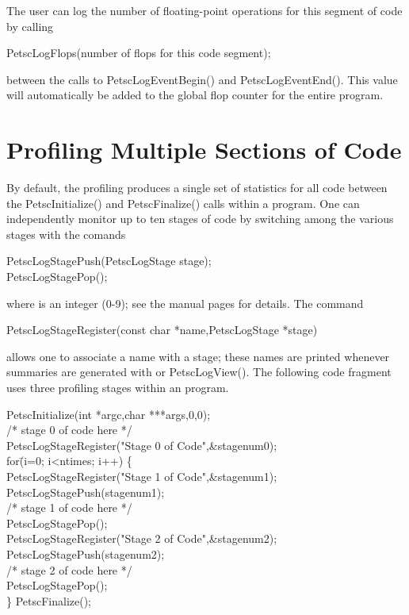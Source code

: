 {{The user can log the number of floating-point operations 
for this segment of code by calling 
\begin{tabbing}
    PetscLogFlops(number of flops for this code segment);
\end{tabbing}
between the calls to PetscLogEventBegin() and PetscLogEventEnd().
This value will automatically be added to the global flop counter for the
entire program.

\section{Profiling Multiple Sections of Code}
\label{sec_profstages}

By default, the profiling produces a single set of statistics for all
code between the PetscInitialize() and PetscFinalize()
calls within a program.  One can independently monitor up to ten
stages of code by switching among the various stages with the comands
\begin{tabbing}
   PetscLogStagePush(PetscLogStage stage);\\
   PetscLogStagePop();
\end{tabbing}
where  is an integer (0-9); see the manual pages for details.
The command 
\begin{tabbing}
   PetscLogStageRegister(const char *name,PetscLogStage *stage)
\end{tabbing}
allows one to associate a name with a stage; these names are printed whenever
summaries are generated with  or PetscLogView().
The following code fragment uses three profiling stages within an program.

\begin{tabbing}
   PetscInitialize(int *argc,char ***args,0,0);\\
   /* stage 0 of code here */\\
   PetscLogStageRegister("Stage 0 of Code",\&stagenum0);\\
   for\= (i=0; i<ntimes; i++) \{\\
      \>PetscLogStageRegister("Stage 1 of Code",\&stagenum1);\\
      \>PetscLogStagePush(stagenum1);\\
      \>/* stage 1 of code here */\\
      \>PetscLogStagePop();\\
      \>PetscLogStageRegister("Stage 2 of Code",\&stagenum2);\\
      \>PetscLogStagePush(stagenum2);\\
      \>/* stage 2 of code here */\\
      \>PetscLogStagePop();\\
   \}
   PetscFinalize();
\end{tabbing}

}}
